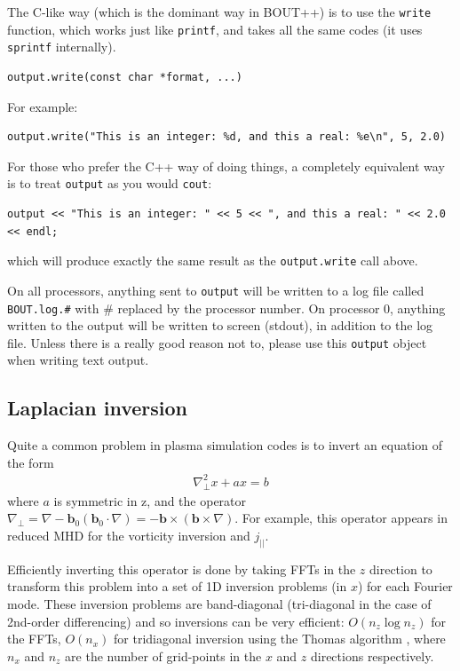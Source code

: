 \documentclass[12pt]{article}
\newcommand{\code}[1]{\texttt{#1}}
\begin{document}
The C-like way (which is the dominant way in BOUT++) is to use the \code{write}
function, which works just like \code{printf}, and takes all the same codes (it
uses \code{sprintf} internally).
%
%
\begin{lstlisting}
output.write(const char *format, ...)
\end{lstlisting}
%
For example:
%
\begin{lstlisting}
output.write("This is an integer: %d, and this a real: %e\n", 5, 2.0)
\end{lstlisting}
%
For those who prefer the C++ way of doing things, a completely equivalent way
is to treat \code{output} as you would \code{cout}:
%
\begin{lstlisting}
output << "This is an integer: " << 5 << ", and this a real: " << 2.0 << endl;
\end{lstlisting}
%
which will produce exactly the same result as the \code{output.write} call
above.

On all processors, anything sent to \code{output} will be written to a log file
called \texttt{BOUT.log.\#} with \# replaced by the processor number. On
processor 0, anything written to the output will be written to screen (stdout),
in addition to the log file.  Unless there is a really good reason not to,
please use this \code{output} object when writing text output.



\subsection{Laplacian inversion}
%
%
Quite a common problem in plasma simulation codes is to invert an equation of
the form
%
\begin{align}
\nabla_\perp^2 x + a x = b
\end{align}
%
where $a$ is symmetric in z, and the operator $\nabla_\perp = \nabla -
\mathbf{b}_0\left(\mathbf{b}_0\cdot\nabla\right) = -\mathbf{b\times}
\left(\mathbf{b\times}\nabla\right)$. For example, this operator appears in
reduced MHD for the vorticity inversion and $j_{||}$.

Efficiently inverting this operator is done by taking FFTs in the $z$ direction
to transform this problem into a set of 1D inversion problems (in $x$) for each
Fourier mode.  These inversion problems are band-diagonal (tri-diagonal in the
case of 2nd-order differencing) and so inversions can be very efficient:
$O\left(n_z \log n_z\right)$ for the FFTs, $O\left(n_x\right)$ for tridiagonal
inversion using the Thomas algorithm \cite{press-1999}, where $n_x$ and $n_z$
are the number of grid-points in the $x$ and $z$ directions respectively.
\end{document}
